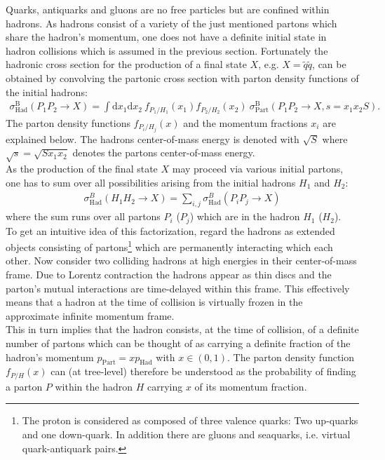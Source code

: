 Quarks, antiquarks and gluons are no free particles but are confined within hadrons. As hadrons consist of a variety of the just mentioned partons which share the hadron's momentum, one does not have a definite initial state in hadron collisions which is assumed in the previous section. Fortunately the hadronic cross section for the production of a final state $X$, e.g. $X = \tilde{q} \tilde{q}$, can be obtained by convolving the partonic cross section with parton density functions of the initial hadrons:
\begin{align}
\sigma^\mathrm{B}_{\mathrm{Had}}(P_1 P_2 \to X) = \int \mbox{d}x_1 \mbox{d}x_2\ f_{P_1/H_1}(x_1) f_{P_2/H_2}(x_2)\ \sigma^\mathrm{B}_{\mathrm{Part}} (P_1 P_2 \to X, s = x_ 1x_2 S).\label{eq:facTheorem}
\end{align}
The parton density functions $f_{P_i/H_j}(x)$ and the momentum fractions $x_i$ are explained below. The hadrons center-of-mass energy is denoted with $\sqrt{S}$ where $\sqrt{s} = \sqrt{S x_1 x_2}$ denotes the partons center-of-mass energy.\\
As the production of the final state $X$ may proceed via various initial partons, one has to sum over all possibilities arising from the initial hadrons $H_1$ and $H_2$:
\begin{align}
\sigma^B_{\mathrm{Had}}(H_1 H_2 \to X) = \sum_{i,j} \sigma^B_{\mathrm{Had}}(P_i P_j \to X)
\end{align}
where the sum runs over all partons $P_i$ ($P_j$) which are in the hadron $H_1$ ($H_2$).\\
To get an intuitive idea of this factorization, regard the hadrons as extended objects consisting of partons\footnote{The proton is considered as composed of three valence quarks: Two up-quarks and one down-quark. In addition there are gluons and seaquarks, i.e. virtual quark-antiquark pairs.} which are permanently interacting which each other. Now consider two colliding hadrons at high energies in their center-of-mass frame. Due to Lorentz contraction the hadrons appear as thin discs and the parton's mutual interactions are time-delayed within this frame. This effectively means that a hadron at the time of collision is virtually frozen in the approximate infinite momentum frame.\\ %
This in turn implies that the hadron consists, at the time of collision, of a definite number of partons which can be thought of as carrying a definite fraction of the hadron's  momentum $p_{\mathrm{Part}} = x p_{\mathrm{Had}}$ with $x \in \left(0, 1 \right)$. The parton density function $f_{P/H}(x)$ can (at tree-level) therefore be understood as the probability of finding a parton $P$ within the hadron $H$ carrying $x$ of its momentum fraction. 
